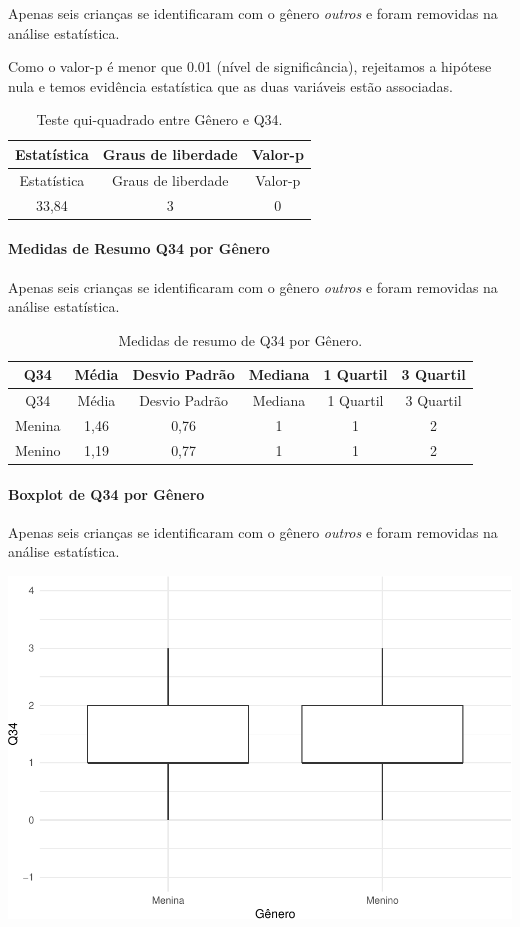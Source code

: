 \documentclass[]{article}
\let\oldparagraph\paragraph
\renewcommand{\paragraph}[1]{\oldparagraph{#1}\mbox{}}
\begin{document}
Apenas seis crianças se identificaram com o gênero \emph{outros} e foram removidas na análise estatística.

Como o valor-p é menor que 0.01 (nível de significância), rejeitamos a hipótese nula e temos evidência estatística que as duas variáveis estão associadas.

\begin{longtable}[]{@{}ccc@{}}
\caption{\label{tab:unnamed-chunk-1206}Teste qui-quadrado entre Gênero e Q34.}\tabularnewline
\toprule
Estatística & Graus de liberdade & Valor-p\tabularnewline
\midrule
\endfirsthead
\toprule
Estatística & Graus de liberdade & Valor-p\tabularnewline
\midrule
\endhead
33,84 & 3 & 0\tabularnewline
\bottomrule
\end{longtable}

\cleardoublepage

\hypertarget{medidas-de-resumo-q34-por-guxeanero}{%
\paragraph{Medidas de Resumo Q34 por Gênero}\label{medidas-de-resumo-q34-por-guxeanero}}

Apenas seis crianças se identificaram com o gênero \emph{outros} e foram removidas na análise estatística.

\begin{longtable}[]{@{}cccccc@{}}
\caption{\label{tab:unnamed-chunk-1207}Medidas de resumo de Q34 por Gênero.}\tabularnewline
\toprule
Q34 & Média & Desvio Padrão & Mediana & 1 Quartil & 3 Quartil\tabularnewline
\midrule
\endfirsthead
\toprule
Q34 & Média & Desvio Padrão & Mediana & 1 Quartil & 3 Quartil\tabularnewline
\midrule
\endhead
Menina & 1,46 & 0,76 & 1 & 1 & 2\tabularnewline
Menino & 1,19 & 0,77 & 1 & 1 & 2\tabularnewline
\bottomrule
\end{longtable}

\hypertarget{boxplot-de-q34-por-guxeanero}{%
\paragraph{Boxplot de Q34 por Gênero}\label{boxplot-de-q34-por-guxeanero}}

Apenas seis crianças se identificaram com o gênero \emph{outros} e foram removidas na análise estatística.

\begin{center}\includegraphics[width=0.75\linewidth]{relatorio_covid19_files/figure-latex/unnamed-chunk-1208-1} \end{center}
\end{document}
